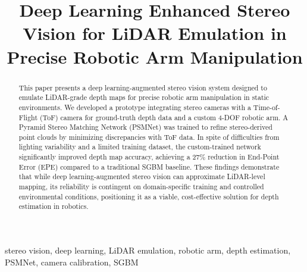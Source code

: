 \documentclass[conference]{IEEEtran}
\begin{document}
\title{Deep Learning Enhanced Stereo Vision for LiDAR Emulation in Precise Robotic Arm Manipulation}


\author{
\IEEEauthorblockN{\vphantom{A}} %
\IEEEauthorblockA{\vspace{3\baselineskip}} %
\and
\IEEEauthorblockN{\vphantom{A}}
\IEEEauthorblockA{\vspace{3\baselineskip}}
}

\maketitle

\begin{abstract}
This paper presents a deep learning-augmented stereo vision system designed to emulate LiDAR-grade depth maps for precise robotic arm manipulation in static environments. We developed a prototype integrating stereo cameras with a Time-of-Flight (ToF) camera for ground-truth depth data and a custom 4-DOF robotic arm. A Pyramid Stereo Matching Network (PSMNet) was trained to refine stereo-derived point clouds by minimizing discrepancies with ToF data. In spite of difficulties from lighting variability and a limited training dataset, the custom-trained network significantly improved depth map accuracy, achieving a 27\% reduction in End-Point Error (EPE) compared to a traditional SGBM baseline. These findings demonstrate that while deep learning-augmented stereo vision can approximate LiDAR-level mapping, its reliability is contingent on domain-specific training and controlled environmental conditions, positioning it as a viable, cost-effective solution for depth estimation in robotics.
\end{abstract}

\begin{IEEEkeywords}
stereo vision, deep learning, LiDAR emulation, robotic arm, depth estimation, PSMNet, camera calibration, SGBM
\end{IEEEkeywords}
\end{document}
